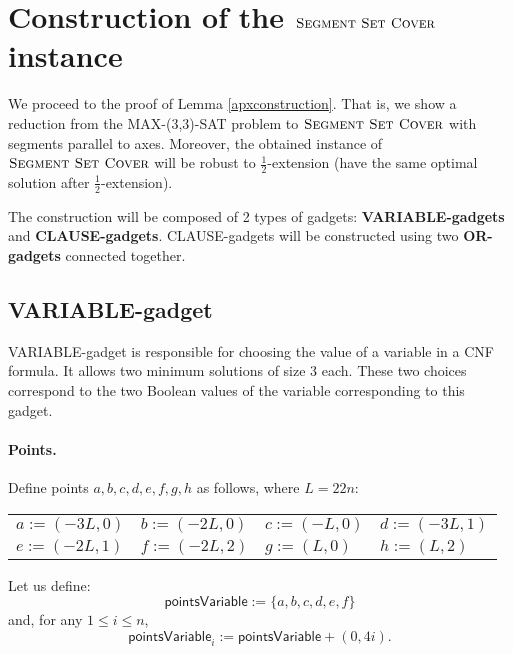 \section{Construction of the $\textsc{Segment Set Cover}$ instance}
\label{construction_description}
We proceed to the proof of Lemma \ref{apxconstruction}.
That is, we show a reduction from the MAX-(3,3)-SAT problem
to $\textsc{Segment Set Cover}$ with segments
parallel to axes. Moreover, the obtained instance
of $\textsc{Segment Set Cover}$ will be robust
to $\frac{1}{2}$-extension (have the same optimal solution
after $\frac{1}{2}$-extension).

The construction will be composed of 2 types of gadgets:
\textbf{VARIABLE-gadgets} and \textbf{CLAUSE-gadgets}.
CLAUSE-gadgets will be constructed using two \textbf{OR-gadgets}
connected together.

\subsection{VARIABLE-gadget}

VARIABLE-gadget is responsible for choosing the value of a variable
in a CNF formula. It allows two minimum solutions of size 3 each.
These two choices correspond to the two Boolean values of the variable
corresponding to this gadget.

\paragraph{Points.}

Define points $a,b,c,d,e,f,g,h$ as follows, where $L = 22n$:


\newcommand{\pointsVarNoArg}{\mathsf{pointsVariable} }
\newcommand{\pointsVar}[1]{\mathsf{pointsVariable}_{#1} }
\newcommand{\chooseVar}[2]{\mathsf{chooseVariable}^{#1}_{#2} }
\newcommand{\segmentsVar}[1]{\mathsf{segmentsVariable}_{#1} }



\begin{center}
\begin{tabular}{ l l l l}
	$a := (-3L, 0)$ &
	$b := (-2L, 0)$ & 
	$c := (-L, 0)$ & 
	$d := (-3L, 1)$ \\  
	$e := (-2L, 1)$ & 
	$f := (-2L, 2)$ &
	$g := (L, 0)$ &
	$h := (L, 2)$
\end{tabular}
\end{center}


Let us define:
$$\pointsVarNoArg :=  \{a, b, c, d, e, f\}$$
and, for any $1 \le i \le n$,
$$\pointsVar{i} := \pointsVarNoArg + (0, 4i).$$

